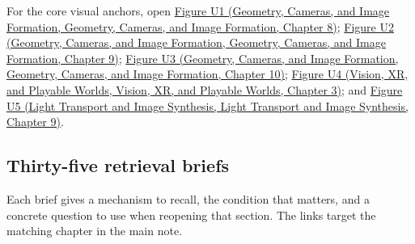 For the core visual anchors, open \href{../03-Geometry-Cameras-and-Image-Formation/main.pdf\#nameddest=03-visual-computing-i-ch001-figure-u1---linear-maps-separate-directions-stretches-and-output-placement}{Figure U1 (Geometry, Cameras, and Image Formation, Geometry, Cameras, and Image Formation, Chapter 8)}; \href{../03-Geometry-Cameras-and-Image-Formation/main.pdf\#nameddest=03-visual-computing-i-ch002-figure-u2---a-half-edge-separates-face-traversal-from-edge-traversal}{Figure U2 (Geometry, Cameras, and Image Formation, Geometry, Cameras, and Image Formation, Chapter 9)}; \href{../03-Geometry-Cameras-and-Image-Formation/main.pdf\#nameddest=03-visual-computing-i-ch003-figure-u3---two-signals-can-share-the-same-samples}{Figure U3 (Geometry, Cameras, and Image Formation, Geometry, Cameras, and Image Formation, Chapter 10)}; \href{../07-Vision-XR-and-Playable-Worlds/main.pdf\#nameddest=04-visual-computing-ii-ch032-figure-u4---lighting-rank-determines-which-normal-components-can-be-measured}{Figure U4 (Vision, XR, and Playable Worlds, Vision, XR, and Playable Worlds, Chapter 3)}; and \href{../04-Light-Transport-and-Image-Synthesis/main.pdf\#nameddest=04-visual-computing-ii-ch035-figure-u5---a-direct-light-renderer-makes-the-pipeline-executable}{Figure U5 (Light Transport and Image Synthesis, Light Transport and Image Synthesis, Chapter 9)}.

\subsection{Thirty-five retrieval briefs}\label{appendix-a8f634b076b5-thirty-five-retrieval-briefs}

Each brief gives a mechanism to recall, the condition that matters, and a concrete question to use when reopening that section. The links target the matching chapter in the main note.

